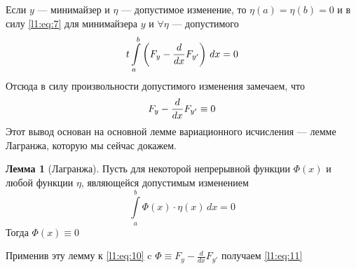 \documentclass[12pt,a4paper,openany,fleqn]{book}
\newcommand{\der}[2]{\ensuremath{\frac{d#1}{d#2}}}
\theoremstyle{definition}
\newtheorem{_lemm}{Лемма}[section]
\begin{document}
Если $y$ --- минимайзер и $\eta$ --- допустимое изменение, то $\eta(a)=\eta(b)=0$ и в силу \eqref{l1:eq:7} для минимайзера $y$ и $\forall\eta$ --- допустимого
\begin{equation}
	\label{l1:eq:10}
	\hfill t\int\limits_a^b\left(F_y-\der{}{x}F_{y'}\right)\,dx=0\hfill
\end{equation}
Отсюда в силу произвольности допустимого изменения замечаем, что 
\begin{equation}
	\label{l1:eq:11}
	\hfill F_y-\der{}{x}F_{y'}\equiv0\hfill
\end{equation}
Этот вывод основан на основной лемме вариационного исчисления --- лемме Лагранжа, которую мы сейчас докажем.
\begin{_lemm}[Лагранжа]
	Пусть для некоторой непрерывной функции $\Phi(x)$ и любой функции $\eta$, являющейся допустимым изменением
	\begin{equation}
		\label{l1:eq:12}
		\int\limits_a^b \Phi(x)\cdot\eta(x)\,dx=0
	\end{equation}
	Тогда $\Phi(x)\equiv0$
\end{_lemm}
\noindent Применив эту лемму к \eqref{l1:eq:10} c $\Phi\equiv F_y-\der{}{x}F_{y'}$ получаем \eqref{l1:eq:11}
\end{document}
